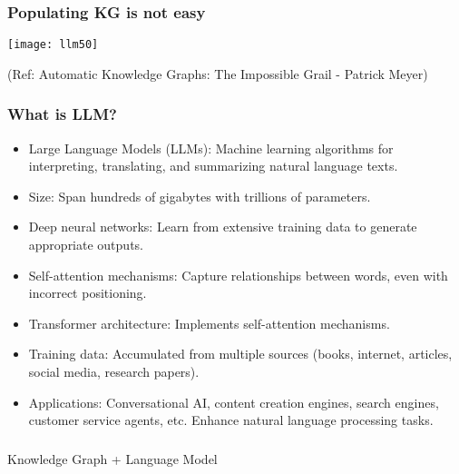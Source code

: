 \begin{frame}[fragile]\frametitle{Populating KG is not easy}

\begin{center}
\texttt{[image: llm50]}
\end{center}

{\tiny (Ref: Automatic Knowledge Graphs: The Impossible Grail - Patrick Meyer)}

\end{frame}

\begin{frame}[fragile]\frametitle{What is LLM?}

\begin{itemize}
\item Large Language Models (LLMs): Machine learning algorithms for interpreting, translating, and summarizing natural language texts.
\item Size: Span hundreds of gigabytes with trillions of parameters.
\item Deep neural networks: Learn from extensive training data to generate appropriate outputs.
\item Self-attention mechanisms: Capture relationships between words, even with incorrect positioning.
\item Transformer architecture: Implements self-attention mechanisms.
\item Training data: Accumulated from multiple sources (books, internet, articles, social media, research papers).
\item Applications: Conversational AI, content creation engines, search engines, customer service agents, etc.
Enhance natural language processing tasks.
\end{itemize}

\end{frame}


\begin{frame}[fragile]\frametitle{}
\begin{center}
{\Large Knowledge Graph + Language Model}

\end{center}
\end{frame}


